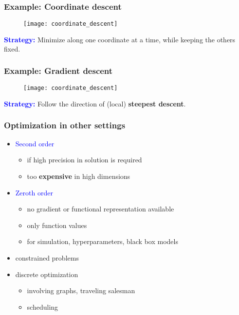 \documentclass{beamer}
\begin{document}
\begin{frame}
  \frametitle{Example: Coordinate descent}
  \begin{figure}[ht]
    \centering
    \texttt{[image: coordinate\_descent]}
  \end{figure}
  \textcolor{blue}{\textbf{Strategy:}} Minimize along one coordinate at a time, while keeping the others fixed.
\end{frame}


\begin{frame}
  \frametitle{Example: Gradient descent}
  \begin{figure}[ht]
    \centering
    \texttt{[image: coordinate\_descent]}
  \end{figure}
  \textcolor{blue}{\textbf{Strategy:}} Follow the direction of (local) \textbf{steepest descent}.
\end{frame}


\begin{frame}
  \frametitle{Optimization in other settings}
  \begin{itemize}
    \item \textcolor{blue}{Second order}
          \begin{itemize}
            \item if high precision in solution is required
            \item too \textbf{expensive} in high dimensions
          \end{itemize}
    \item \textcolor{blue}{Zeroth order}
          \begin{itemize}
             \item no gradient or functional representation available
             \item only function values
             \item for simulation, hyperparameters, black box models
          \end{itemize}
    \item constrained problems
    \item discrete optimization
          \begin{itemize}
            \item involving graphs, traveling salesman
            \item scheduling
          \end{itemize}
  \end{itemize}
\end{frame}
\end{document}
